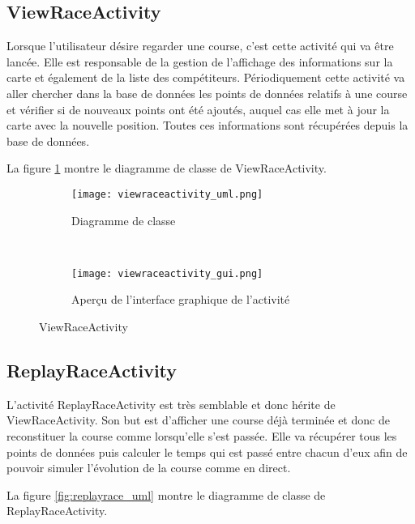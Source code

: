 \subsection{ViewRaceActivity}

Lorsque l'utilisateur désire regarder une course, c'est cette activité qui va être lancée. Elle est responsable de la gestion de l'affichage des informations sur la carte et également de la liste des compétiteurs. Périodiquement cette activité va aller chercher dans la base de données les points de données relatifs à une course et vérifier si de nouveaux points ont été ajoutés, auquel cas elle met à jour la carte avec la nouvelle position. Toutes ces informations sont récupérées depuis la base de données.

La figure \ref{fig:viewraceactivity_uml} montre le diagramme de classe de ViewRaceActivity.

\begin{figure}[htb!]
    \centering
    \begin{subfigure}[htb]{0.49\textwidth}
		\texttt{[image: viewraceactivity\_uml.png]} 
		\caption{Diagramme de classe}
		\label{fig:viewraceactivity_uml}
    \end{subfigure}
    ~ %
    \begin{subfigure}[htb]{0.49\textwidth}
		\texttt{[image: viewraceactivity\_gui.png]} 
		\caption{Aperçu de l'interface graphique de l'activité}
		\label{fig:viewraceactivity_gui}
    \end{subfigure}
    \caption{ViewRaceActivity}\label{fig:viewraceactivity_fig}
\end{figure}

\subsection{ReplayRaceActivity}

L'activité ReplayRaceActivity est très semblable et donc hérite de ViewRaceActivity. Son but est d'afficher une course déjà terminée et donc de reconstituer la course comme lorsqu'elle s'est passée. Elle va récupérer tous les points de données puis calculer le temps qui est passé entre chacun d'eux afin de pouvoir simuler l'évolution de la course comme en direct.

La figure \ref{fig:replayrace_uml} montre le diagramme de classe de ReplayRaceActivity.

